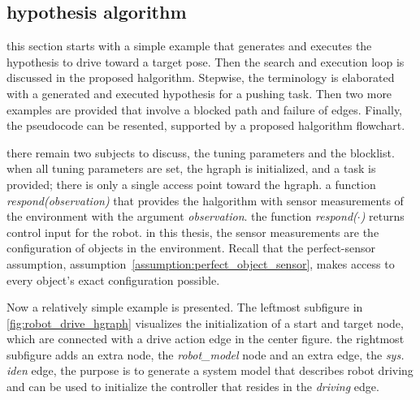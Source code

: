 \subsection{hypothesis algorithm}%
\label{subsec:halgorithm}
this section starts with a simple example that generates and executes the hypothesis to drive toward a target pose. Then the search and execution loop is discussed in the proposed \ac{halgorithm}. Stepwise, the terminology is elaborated with a generated and executed hypothesis for a pushing task. Then two more examples are provided that involve a blocked path and failure of edges. Finally, the pseudocode can be resented, supported by a proposed \ac{halgorithm} flowchart.\bs


there remain two subjects to discuss, the tuning parameters and the blocklist. 
when all tuning parameters are set, the \ac{hgraph} is initialized, and a task is provided; there is only a single access point toward the \ac{hgraph}. a function \textit{respond(observation)} that provides the \ac{halgorithm} with sensor measurements of the environment with the argument \textit{observation}. the function \textit{respond($\cdot$)} returns control input for the robot. in this thesis, the sensor measurements are the configuration of objects in the environment. Recall that the perfect-sensor assumption, assumption~\ref{assumption:perfect_object_sensor}, makes access to every object's exact configuration possible.\bs

Now a relatively simple example is presented. The leftmost subfigure in \cref{fig:robot_drive_hgraph} visualizes the initialization of a start and target node, which are connected with a drive action edge in the center figure. the rightmost subfigure adds an extra node, the \textit{robot\_model} node and an extra edge, the \textit{sys. iden} edge, the purpose is to generate a system model that describes robot driving and can be used to initialize the controller that resides in the \textit{driving} edge.\bs


